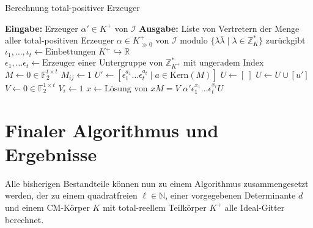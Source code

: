 \documentclass[12pt,a4paper,halfparskip,headsepline,bibtotocnumbered]{scrreprt}
\theoremstyle{nummermitklammern}
\theoremstyle{nonumberbreak}
\newcommand{\N}{\mathbb{N}}
\newcommand{\Z}{\mathbb{Z}}
\newcommand{\R}{\mathbb{R}}
\newcommand{\F}{\mathbb{F}}
\newcommand{\I}{\mathcal{I}}
\newcommand{\Kern}{\text{Kern}}
\begin{document}
\begin{algorithm}[H]
	\caption{Berechnung total-positiver Erzeuger}\label{alg:posgen}
	\begin{algorithmic}[1]
		\State \textbf{Eingabe:} Erzeuger $\alpha' \in K^+$ von $\I$
		\State \textbf{Ausgabe:} Liste von Vertretern der Menge aller total-positiven Erzeuger $\alpha \in K_{\gg 0}^+$ von $\I$ modulo $\lbrace \lambda \overline{\lambda} \mid \lambda \in \Z_K^\ast \rbrace$ zurückgibt
		\\
		\State $\iota_1, \dots, \iota_t \gets \text{Einbettungen } K^+ \hookrightarrow \R$
		\State $\epsilon_1, \dots \epsilon_t \gets \text{Erzeuger einer Untergruppe von } \Z_{K^+}^\ast \text{ mit ungeradem Index}$
		\State $M \gets 0 \in \F_2^{t \times t}$
				\State $M_{ij} \gets 1$
			\EndIf
		\EndFor
		\State $U' \gets \left[ \epsilon_1^{a_1} \dots \epsilon_t^{a_t} \mid a \in \Kern(M) \right]$
		\State $U \gets \left[ \ \right]$
			\If {$u' \neq u \lambda \overline{\lambda} \text{ für alle } u \in U, \lambda \in \Z_K^\ast$}
				\State $U \gets U \cup \left[ u' \right]$
			\EndIf
		\EndFor
		\State $V \gets 0 \in \F_2^{1 \times t}$
				\State $V_i \gets 1$
			\EndIf
		\EndFor
		\State $x \gets \text{Lösung von } xM = V$
		\State \Return $\alpha'\epsilon_1^{x_1} \dots \epsilon_t^{x_t} U$
	\end{algorithmic}
\end{algorithm}

\section{Finaler Algorithmus und Ergebnisse}

Alle bisherigen Bestandteile können nun zu einem Algorithmus zusammengesetzt werden, der zu einem quadratfreien $\ell \in \N$, einer vorgegebenen Determinante $d$ und einem CM-Körper $K$ mit total-reellem Teilkörper $K^+$ alle Ideal-Gitter berechnet.
\end{document}

